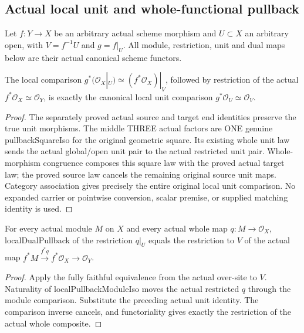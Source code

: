 \subsection{Actual local unit and whole-functional pullback}
Let
$f:Y\to X$ be an arbitrary actual scheme morphism and $U\subset X$ an
arbitrary open, with $V=f^{-1}U$ and $g=f|_U$. All module, restriction,
unit and dual maps below are their actual canonical scheme functors.

\begin{lemma}
\label{lem:seven-local-module-pullback-actual-unit}
\leanok
{}
The local comparison $g^*(\mathcal O_X|_U)\simeq(f^*\mathcal O_X)|_V$,
followed by restriction of the actual $f^*\mathcal O_X\simeq\mathcal O_Y$,
is exactly the canonical local unit comparison $g^*\mathcal O_U\simeq\mathcal O_V$.
\end{lemma}
\begin{proof}
The separately proved actual source and target end identities preserve the
true unit morphisms. The middle THREE actual factors are ONE genuine
pullbackSquareIso for the original geometric square. Its existing whole
unit law sends the actual global/open unit pair to the actual restricted
unit pair. Whole-morphism congruence composes this square law with the
proved actual target law; the proved source law cancels the remaining
original source unit maps. Category association gives precisely the
entire original local unit comparison. No expanded carrier or pointwise
conversion, scalar premise, or supplied matching identity is used.
\end{proof}

\begin{lemma}
\label{lem:seven-local-dual-pullback-whole-functional}
\leanok
{}
For every actual module $M$ on $X$ and every actual whole map
$q:M\to\mathcal O_X$, localDualPullback of the restriction $q|_U$ equals
the restriction to $V$ of the actual map
$f^*M\xrightarrow{f^*q}f^*\mathcal O_X\to\mathcal O_Y$.
\end{lemma}
\begin{proof}
Apply the fully faithful equivalence from the actual over-site to $V$.
Naturality of localPullbackModuleIso moves the actual restricted $q$
through the module comparison. Substitute the preceding actual unit
identity. The comparison inverse cancels, and functoriality gives exactly
the restriction of the actual whole composite.
\end{proof}


